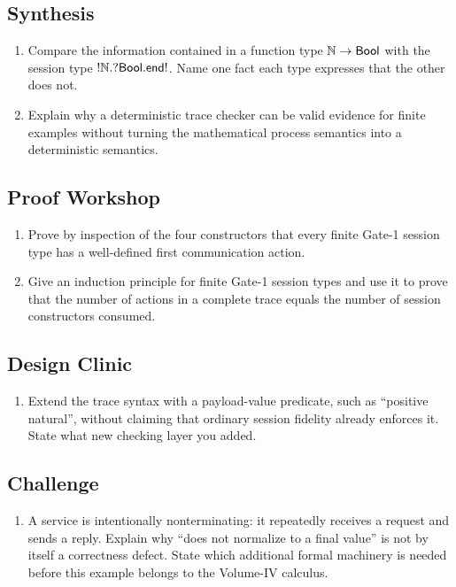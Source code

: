 \subsection*{Synthesis}
\begin{enumerate}[label=\textbf{1.\arabic*},start=7]
\item Compare the information contained in a function type \(\mathbb{N}\to\mathsf{Bool}\) with the session type
\(!\mathbb{N}.?\mathsf{Bool}.\mathsf{end!}\). Name one fact each type expresses that the other does not.
\item Explain why a deterministic trace checker can be valid evidence for finite examples without
turning the mathematical process semantics into a deterministic semantics.
\end{enumerate}

\subsection*{Proof Workshop}
\begin{enumerate}[label=\textbf{1.\arabic*},start=9]
\item Prove by inspection of the four constructors that every finite Gate-1 session type has a
well-defined first communication action.
\item Give an induction principle for finite Gate-1 session types and use it to prove that the
number of actions in a complete trace equals the number of session constructors consumed.
\end{enumerate}

\subsection*{Design Clinic}
\begin{enumerate}[label=\textbf{1.\arabic*},start=11]
\item Extend the trace syntax with a payload-value predicate, such as ``positive natural'', without
claiming that ordinary session fidelity already enforces it. State what new checking layer you added.
\end{enumerate}

\subsection*{Challenge}
\begin{enumerate}[label=\textbf{1.\arabic*},start=12]
\item A service is intentionally nonterminating: it repeatedly receives a request and sends a reply.
Explain why ``does not normalize to a final value'' is not by itself a correctness defect. State
which additional formal machinery is needed before this example belongs to the Volume-IV calculus.
\end{enumerate}
